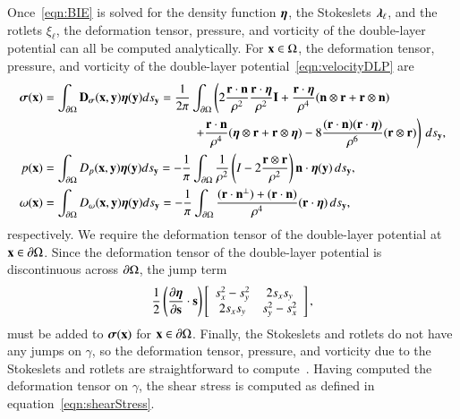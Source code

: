 \documentclass[preprint,10pt]{elsarticle}
\begin{document}
Once~\eqref{eqn:BIE} is solved for the density function ${\boldsymbol\eta}$, the
Stokeslets ${\boldsymbol\lambda}_\ell$, and the rotlets $\xi_\ell$, the deformation
tensor, pressure, and vorticity of the double-layer potential can all be
computed analytically.  For ${\mathbf{x}} \in \Omega$, the deformation tensor,
pressure, and vorticity of the double-layer
potential~\eqref{eqn:velocityDLP} are
\begin{align}
  \label{eqn:deformationDLP} 
  \ssigma(\xx) &= \int_{\bd\Omega} \mathbf{D}_{\ssigma}(\xx,\yy) 
      \eeta(\yy) ds_{\yy} 
  = \frac{1}{2\pi}\int_{\bd\Omega} \left(
    2\frac{\rr \cdot \nn}{\rho^2} \frac{\rr \cdot \eeta}{\rho^2} \II + 
    \frac{\rr \cdot \eeta}{\rho^4} (\nn \otimes \rr + \rr \otimes \nn) 
    \right. \nonumber \\
    & \qquad\qquad\qquad\qquad\qquad\qquad \left.
    +\frac{\rr \cdot \nn}{\rho^4} (\eeta \otimes \rr + \rr \otimes \eeta) - 
    8\frac{(\rr \cdot \nn)(\rr \cdot \eeta)}{\rho^6}(\rr \otimes \rr)
    \right) \, ds_\yy, \\
%
  p(\xx) &= \int_{\bd\Omega} D_{p}(\xx,\yy) 
      \eeta(\yy) ds_{\yy} 
  = -\frac{1}{\pi}\int_{\bd\Omega} \frac{1}{\rho^2}
    \left(I - 2 \frac{\rr \otimes \rr}{\rho^2}\right) \nn \cdot
      \eeta(\yy)\,ds_\yy, \\
%
  \label{eqn:vorticityDLP} 
  \omega(\xx) &= \int_{\bd\Omega} D_{\omega}(\xx,\yy) 
      \eeta(\yy) ds_{\yy} 
  = -\frac{1}{\pi} \int_{\bd\Omega}
    \frac{(\rr \cdot \nn^\perp) + (\rr \cdot \nn)}{\rho^4} 
      (\rr \cdot \eeta) \, ds_\yy,
\end{align}
respectively. We require the deformation tensor of the double-layer potential at
${\mathbf{x}} \in {\partial} \Omega$.  Since the deformation tensor of the double-layer
potential is discontinuous across ${\partial}\Omega$, the jump term 
\begin{align}
  \frac{1}{2} \left(\frac{\partial {\boldsymbol\eta}}{\partial {\mathbf{s}}} \cdot {\mathbf{s}} \right) \left[
    \begin{array}{cc}
      s_x^2 - s_y^2 & 2s_x s_y \\ 2s_x s_y & s_y^2 - s_x^2
    \end{array}
  \right],
  \label{eqn:deformationJump}
\end{align}
must be added to ${\boldsymbol\sigma}({\mathbf{x}})$ for ${\mathbf{x}} \in {\partial}\Omega$.  Finally, the
Stokeslets and rotlets do not have any jumps on $\gamma$, so the
deformation tensor, pressure, and vorticity due to the Stokeslets and
rotlets are straightforward to compute~\cite{poz1992}.  Having computed
the deformation tensor on $\gamma$, the shear stress is computed as
defined in equation~\eqref{eqn:shearStress}.  
\end{document}
